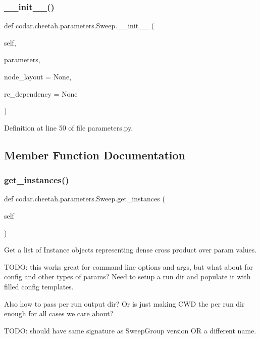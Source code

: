 \subsubsection{\texorpdfstring{\+\_\+\+\_\+init\+\_\+\+\_\+()}{\_\_init\_\_()}}
{\footnotesize\ttfamily def codar.\+cheetah.\+parameters.\+Sweep.\+\_\+\+\_\+init\+\_\+\+\_\+ (\begin{DoxyParamCaption}\item[{}]{self,  }\item[{}]{parameters,  }\item[{}]{node\+\_\+layout = {\ttfamily None},  }\item[{}]{rc\+\_\+dependency = {\ttfamily None} }\end{DoxyParamCaption})}



Definition at line 50 of file parameters.\+py.



\subsection{Member Function Documentation}
\mbox{\label{classcodar_1_1cheetah_1_1parameters_1_1_sweep_a25c111a2541f852d385d84baf51e9687}} 
\subsubsection{\texorpdfstring{get\+\_\+instances()}{get\_instances()}}
{\footnotesize\ttfamily def codar.\+cheetah.\+parameters.\+Sweep.\+get\+\_\+instances (\begin{DoxyParamCaption}\item[{}]{self }\end{DoxyParamCaption})}

\begin{DoxyVerb}Get a list of Instance objects representing dense cross product over
param values.

TODO: this works great for command line options and args, but
what about for config and other types of params? Need to setup
a run dir and populate it with filled config templates.

Also how to pass per run output dir? Or is just making CWD the
per run dir enough for all cases we care about?

TODO: should have same signature as SweepGroup version OR a
different name.
\end{DoxyVerb}
 


